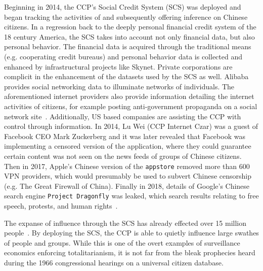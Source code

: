 Beginning in 2014, the CCP's Social Credit System (SCS) was deployed and began
tracking the activities of and subsequently offering inference on Chinese
citizens. In a regression back to the deeply personal financial credit system
of the 18 century America, the SCS takes into account not only financial
data, but also personal behavior. The financial data is acquired through the
traditional means (e.g. cooperating credit bureaus) and personal behavior data
is collected and enhanced by infrastructural projects like Skynet. Private
corporations are complicit in the enhancement of the datasets used by the SCS
as well. Alibaba provides social networking data to illuminate networks of
individuals. The aforementioned internet providers also provide information
detailing the internet activities of citizens, for example posting
anti-government propaganda on a social network site~\cite{qiang2019road}.
Additionally, US based companies are assisting the CCP with control through
information. In 2014, Lu Wei (CCP Internet Czar) was a guest of Facebook CEO
Mark Zuckerberg and it was later revealed that Facebook was implementing a
censored version of the application, where they could guarantee certain content
was not seen on the news feeds of groups of Chinese citizens. Then in 2017,
Apple's Chinese version of the \texttt{appstore} removed more than 600 VPN
providers, which would presumably be used to subvert Chinese censorship (e.g.
The Great Firewall of China). Finally in 2018, details of Google's Chinese
search engine \texttt{Project Dragonfly} was leaked, which search results
relating to free speech, protests, and human rights~\cite{qiang2019road}.

The expanse of influence through the SCS has already effected over 15 million
people~\cite{qiang2019road}. By deploying the SCS, the CCP is able to quietly
influence large swathes of people and groups. While this is one of the overt
examples of surveillance economics enforcing totalitarianism, it is not far
from the bleak prophecies heard during the 1966 congressional hearings on a
universal citizen database.



%
%
%
